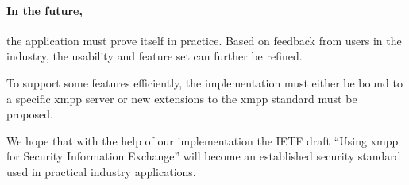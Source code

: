 \paragraph{In the future,} the application must prove itself in practice.
Based on feedback from users in the industry, the usability and feature set can further be refined.

To support some features efficiently, the implementation must either be bound to a specific \gls{xmpp} server or new extensions to the \gls{xmpp} standard must be proposed.

We hope that with the help of our implementation the IETF draft ``Using \gls{xmpp} for Security Information Exchange'' will become an established security standard used in practical industry applications.
